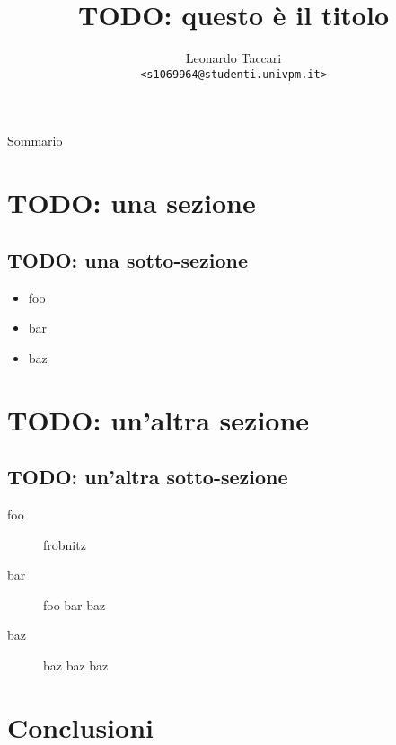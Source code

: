 \documentclass{beamer}
\title{TODO: questo è il titolo}
\author[leot]{Leonardo Taccari \\ {\footnotesize \texttt{<s1069964@studenti.univpm.it>}}}
\date{}
\begin{document}
\begin{frame}
\maketitle
\end{frame}

\begin{frame}{Sommario}
\tableofcontents
\end{frame}

\section{TODO: una sezione}
\begin{frame}{\insertsection}
\end{frame}

\subsection{TODO: una sotto-sezione}
\begin{frame}{\insertsubsection}
\begin{itemize}
\item foo
\item bar
\item baz
\end{itemize}
\end{frame}

\section{TODO: un'altra sezione}
\begin{frame}{\insertsection}
\end{frame}

\subsection{TODO: un'altra sotto-sezione}
\begin{frame}{\insertsubsection}
\begin{description}
\item[foo] frobnitz
\item[bar] foo bar baz
\item[baz] baz baz baz
\end{description}
\end{frame}

\section{Conclusioni}
\begin{frame}{\insertsection}
\end{frame}
\end{document}
